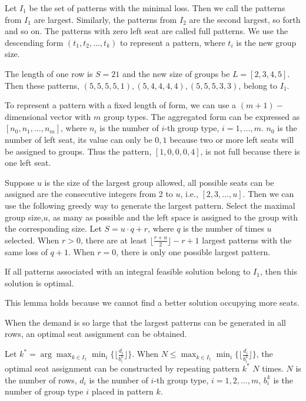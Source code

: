 Let $I_1$ be the set of patterns with the minimal loss. Then we call the patterns from $I_1$ are largest. Similarly, the patterns from $I_2$ are the second largest, so forth and so on. The patterns with zero left seat are called full patterns. We use the descending form $(t_1, t_2, \ldots, t_k)$ to represent a pattern, where $t_i$ is the new group size. 

\begin{example}\label{ex_largest}
  The length of one row is $S = 21$ and the new size of groups be $L = [2, 3, 4, 5]$. Then these patterns, $(5, 5, 5, 5, 1),(5, 4, 4, 4, 4),(5, 5, 5, 3, 3)$, belong to $I_1$. 
\end{example}

To represent a pattern with a fixed length of form, we can use a $(m+1)-$dimensional vector with $m$ group types. The aggregated form can be expressed as $[n_0, n_1, \ldots, n_m]$, where $n_i$ is the number of $i$-th group type, $i=1,\ldots,m$. 
$n_0$ is the number of left seat, its value can only be $0, 1$ because two or more left seats will be assigned to groups. Thus the pattern, $[1, 0, 0, 0, 4]$, is not full because there is one left seat.

Suppose $u$ is the size of the largest group allowed, all possible seats can be assigned are the consecutive integers from 2 to $u$, i.e., $[2,3,\ldots,u]$.
Then we can use the following greedy way to generate the largest pattern. Select the maximal group size,$u$, as many as possible and the left space is assigned to the group with the corresponding size. Let $S = u\cdot q + r$, where $q$ is the number of times $u$ selected. When $r>0$, there are at least $\lfloor \frac{r+u}{2} \rfloor -r +1$ largest patterns with the same loss of $q+1$. When $r =0$, there is only one possible largest pattern.


\begin{lem}
If all patterns associated with an integral feasible solution belong to $I_1$, then this solution is optimal.
\end{lem}

This lemma holds because we cannot find a better solution occupying more seats.

When the demand is so large that the largest patterns can be generated in all rows, an optimal seat assignment can be obtained.

\begin{prop}\label{prop_I_1}
  Let $k^{*} = \arg \max_{k\in I_1} \min_{i} \{\lfloor \frac{d_i}{b_i^k}\rfloor\}$. 
  When $N \leq \max_{k\in I_1} \min_{i} \{\lfloor \frac{d_i}{b_i^k}\rfloor\}$, the optimal seat assignment can be constructed by repeating pattern $k^*$ $N$ times.
  $N$ is the number of rows, $d_i$ is the number of $i$-th group type, $i = 1,2,\ldots, m$, $b_i^k$ is the number of group type $i$ placed in pattern $k$.
\end{prop}

